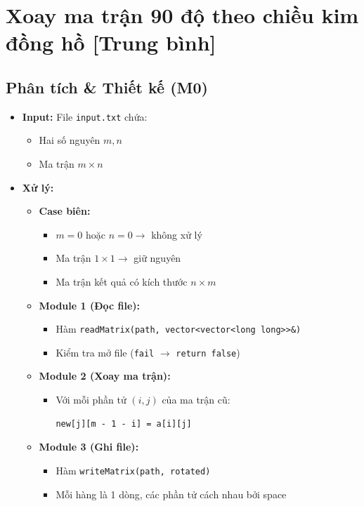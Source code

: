 \section{Xoay ma trận 90 độ theo chiều kim đồng hồ [Trung bình]}
\subsection{Phân tích \& Thiết kế (M0)}
\begin{itemize}
    \item \textbf{Input:}
    File \texttt{input.txt} chứa:
    \begin{itemize}
        \item Hai số nguyên $m, n$
        \item Ma trận $m \times n$
    \end{itemize}

    \item \textbf{Xử lý:}
    \begin{itemize}
        \item \textbf{Case biên:}
        \begin{itemize}
            \item $m = 0$ hoặc $n = 0 \rightarrow$ không xử lý
            \item Ma trận $1 \times 1 \rightarrow$ giữ nguyên
            \item Ma trận kết quả có kích thước $n \times m$
        \end{itemize}

        \item \textbf{Module 1 (Đọc file):}
        \begin{itemize}
            \item Hàm \texttt{readMatrix(path, vector<vector<long long>>\&)}
            \item Kiểm tra mở file (\texttt{fail} $\rightarrow$ \texttt{return false})
        \end{itemize}

        \item \textbf{Module 2 (Xoay ma trận):}
        \begin{itemize}
            \item Với mỗi phần tử $(i,j)$ của ma trận cũ:
            \begin{lstlisting}
new[j][m - 1 - i] = a[i][j]
            \end{lstlisting}
        \end{itemize}

        \item \textbf{Module 3 (Ghi file):}
        \begin{itemize}
            \item Hàm \texttt{writeMatrix(path, rotated)}
            \item Mỗi hàng là 1 dòng, các phần tử cách nhau bởi space
        \end{itemize}
    \end{itemize}


\end{itemize}
